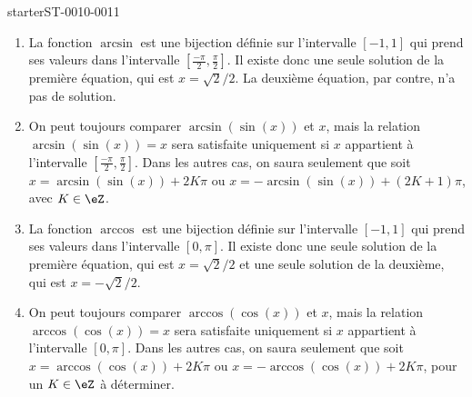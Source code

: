 
\begin{corrige}{starterST-0010-0011}
  \begin{enumerate}
  \item La fonction $\arcsin$ est une bijection définie sur l'intervalle $[-1,1]$ qui prend ses valeurs dans l'intervalle $\displaystyle \left[\frac{-\pi}{2}, \frac{\pi}{2}\right]$. Il existe donc une seule solution de la première équation, qui est $x = \sqrt{2}/2$. La deuxième équation, par contre, n'a pas de solution.   
  \item On peut toujours comparer $\arcsin(\sin (x))$ et $x$, mais la relation $\arcsin(\sin (x)) = x$ sera satisfaite uniquement si $x$ appartient à l'intervalle $\displaystyle \left[\frac{-\pi}{2}, \frac{\pi}{2}\right]$. Dans les autres cas, on saura seulement que soit $x = \arcsin(\sin (x)) + 2K\pi$ ou $x = - \arcsin(\sin (x)) + (2K+1)\pi$, avec $K\in\eZ$. 
\item La fonction $\arccos$ est une bijection définie sur l'intervalle $[-1,1]$ qui prend ses valeurs dans l'intervalle $\displaystyle \left[0, \pi\right]$. Il existe donc une seule solution de la première équation, qui est $x = \sqrt{2}/2$ et une seule solution de la deuxième,  qui est $x = -\sqrt{2}/2$.
  \item  On peut toujours comparer $\arccos(\cos (x))$ et $x$, mais la relation $\arccos(\cos (x)) = x$ sera satisfaite uniquement si $x$ appartient à l'intervalle $\displaystyle \left[0, \pi\right]$. Dans les autres cas, on saura seulement que soit $x = \arccos(\cos (x)) + 2K\pi$ ou $x = - \arccos(\cos (x)) + 2K\pi$, pour un $K\in\eZ$ à déterminer. 
  \end{enumerate}
\end{corrige}

